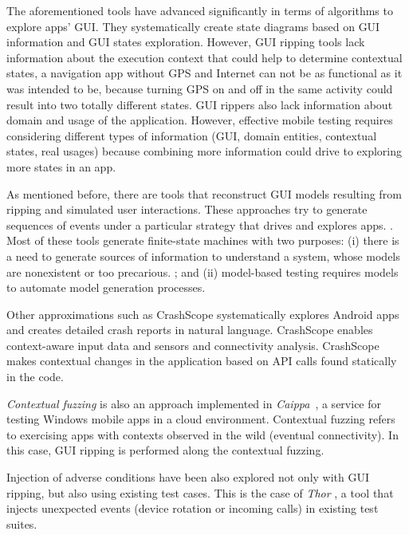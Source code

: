 The aforementioned tools have advanced significantly in terms of algorithms to explore apps' GUI. They systematically create state diagrams based on GUI information and GUI states exploration. However, GUI ripping tools lack information about the execution context that could help to determine contextual states, \eg a navigation app without GPS and Internet can not be as functional as it was intended to be, because turning GPS on and off in the same activity could result into two totally different states. GUI rippers also lack information about domain and usage of the application. However, effective mobile testing requires considering different types of information (\ie GUI, domain entities, contextual states, real usages) because combining more information could drive to exploring more states in an app.

As mentioned before, there are tools that reconstruct GUI models resulting from ripping and simulated user interactions. These approaches try to generate sequences of events under a particular strategy that drives and explores apps. \cite{aimDroid}. Most of these tools generate finite-state machines with two purposes: (i) there is a need to generate sources of information to understand a system, whose models are nonexistent or too precarious. \cite{7516816}; and (ii)  model-based testing requires models to automate model generation processes.

Other approximations such as CrashScope \cite{crashscope} systematically explores Android apps and creates detailed crash reports in natural language. CrashScope enables context-aware input data and sensors and connectivity analysis. CrashScope makes contextual changes in the application based on API calls found statically in the code. 

\textit{Contextual fuzzing} is also an approach implemented in \textit{Caippa}~\cite{Liang:MobiCom14}, a service for testing Windows mobile apps in a cloud environment. Contextual fuzzing refers to exercising apps with contexts observed in the wild (\eg eventual connectivity). In this case, GUI ripping is performed along the contextual fuzzing.

Injection of adverse conditions have been also explored not only with GUI ripping, but also using existing test cases. This is the case of \textit{Thor} \cite{Adamsen:ISSTA2015}, a tool that injects unexpected events (\ie device rotation or incoming calls) in existing test suites.


